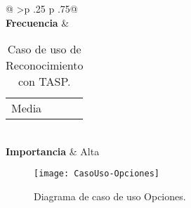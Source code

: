 \begin{table}[]
\begin{tabular}{@{}
>{}p {.25\textwidth} p {.75\textwidth}@{}}
\\ \midrule
\textbf{Frecuencia}     & \begin{tabular}[c]{@{}l@{}}Media\end{tabular}                                                                                                                                                                                                                                                                                                          \\ \midrule
\textbf{Importancia}     & Alta                                                                                                                                                                                                                                                                                                                                                                                                            \\ \bottomrule
\end{tabular}
\caption{Caso de uso de Reconocimiento con TASP.}
\label{tab:tablacaso19}
\end{table}


\begin{figure}[h]
\centering
\texttt{[image: CasoUso-Opciones]}
\caption{Diagrama de caso de uso Opciones.}
\label{fig:B.4}
\end{figure}


